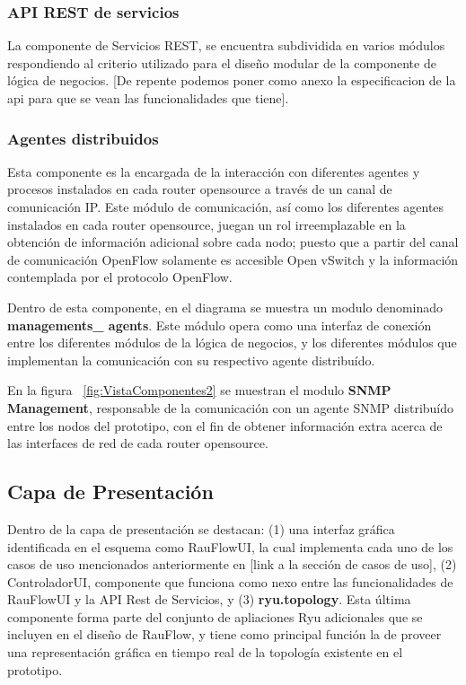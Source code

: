 \subsubsection{API REST de servicios}
La componente de Servicios REST, se encuentra subdividida en varios m\'odulos respondiendo al criterio utilizado para el dise\~no modular de la componente de l\'ogica de negocios. [De repente podemos poner como anexo la especificacion de la api para que se vean las funcionalidades que tiene].

\subsubsection{Agentes distribuidos}
Esta componente es la encargada de la interacci\'on con diferentes agentes y procesos instalados en cada router opensource a través de un canal de comunicación IP. Este m\'odulo de comunicaci\'on, as\'i como los diferentes agentes instalados en cada router opensource, juegan un rol irreemplazable en la obtenci\'on de informaci\'on adicional sobre cada nodo; puesto que a partir del canal de comunicaci\'on OpenFlow solamente es accesible Open vSwitch y la informaci\'on contemplada por el protocolo OpenFlow.

Dentro de esta componente, en el diagrama se muestra un modulo denominado \textbf{managements\_ agents}. Este m\'odulo opera como una interfaz de conexi\'on entre los diferentes m\'odulos de la l\'ogica de negocios, y los diferentes m\'odulos que implementan la comunicaci\'on con su respectivo agente distribu\'ido.

En la figura ~\ref{fig:VistaComponentes2} se muestran el modulo \textbf{SNMP Management}, responsable de  la comunicaci\'on con un agente SNMP distribu\'ido entre los nodos del prototipo, con el fin de obtener informaci\'on extra acerca de las interfaces de red de cada router opensource.\\

\subsection{Capa de Presentación}
Dentro de la capa de presentaci\'on se destacan: (1) una interfaz gr\'afica identificada en el esquema como RauFlowUI, la cual implementa cada uno de los casos de uso mencionados anteriormente en [link a la secci\'on de casos de uso], (2) ControladorUI, componente que funciona como nexo entre las funcionalidades de RauFlowUI y la API Rest de Servicios, y (3) \textbf{ryu.topology}. Esta \'ultima componente forma parte del conjunto de apliaciones Ryu adicionales que se incluyen en el dise\~no de RauFlow, y tiene como principal funci\'on la de proveer una representaci\'on gr\'afica en tiempo real de la topolog\'ia existente en el prototipo.\\

